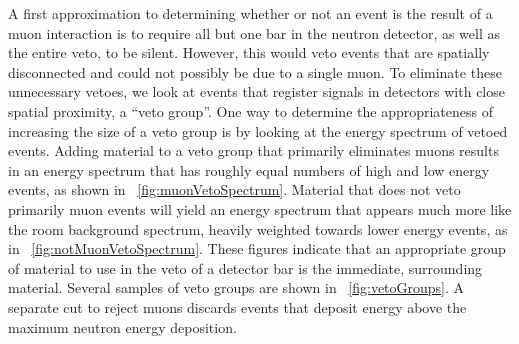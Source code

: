 A first approximation to determining whether or not an event is the result of a muon interaction is to require all but one bar in the neutron detector, as well as the entire veto, to be silent.  However, this would veto events that are spatially disconnected and could not possibly be due to a single muon.  To eliminate these unnecessary vetoes, we look at events that register signals in detectors with close spatial proximity, a ``veto group''.  One way to determine the appropriateness of increasing the size of a veto group is by looking at the energy spectrum of vetoed events.  Adding material to a veto group that primarily eliminates muons results in an energy spectrum that has roughly equal numbers of high and low energy events, as shown in {\fig}~\ref{fig:muonVetoSpectrum}.  Material that does not veto primarily muon events will yield an energy spectrum that appears much more like the room background spectrum, heavily weighted towards lower energy events, as in {\fig}~\ref{fig:notMuonVetoSpectrum}.  These figures indicate that an appropriate group of material to use in the veto of a detector bar is the immediate, surrounding material.  Several samples of veto groups are shown in {\fig}~\ref{fig:vetoGroups}.  A separate cut to reject muons discards events that deposit energy above the maximum neutron energy deposition.    

